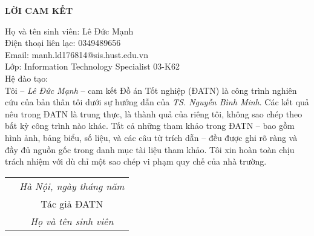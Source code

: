 \documentclass[../DoAn.tex]{subfiles}
\begin{document}
\hfill
\begin{center}
    \LARGE\textbf{LỜI CAM KẾT}\\
\end{center}
\vspace{1cm}
Họ và tên sinh viên: Lê Đức Mạnh\\
Điện thoại liên lạc: 0349489656\\ Email: manh.ld176814@sis.hust.edu.vn\\
Lớp: Information Technology Specialist 03-K62\\
Hệ đào tạo:  \\

\vspace{1cm}
Tôi – \emph{Lê Đức Mạnh} – cam kết Đồ án Tốt nghiệp (ĐATN) là công trình nghiên cứu của bản thân tôi dưới sự hướng dẫn của \emph{TS. Nguyễn Bình Minh}. Các kết quả nêu trong ĐATN là trung thực, là thành quả của riêng tôi, không sao chép theo bất kỳ công trình nào khác. Tất cả những tham khảo trong ĐATN – bao gồm hình ảnh, bảng biểu, số liệu, và các câu từ trích dẫn – đều được ghi rõ ràng và đầy đủ nguồn gốc trong danh mục tài liệu tham khảo. Tôi xin hoàn toàn chịu trách nhiệm với dù chỉ một sao chép vi phạm quy chế của nhà trường.

\begin{table}[H]
\centering
\begin{tabular}{p{5cm} c}
\multicolumn{1}{c}{\textbf{}} &\emph{Hà Nội, ngày\hspace{0.5cm} tháng\hspace{0.5cm}   năm    }\vspace{0.4cm}\\
\textbf{}               & Tác giả ĐATN \vspace{3cm} \\

\textbf{}               & \emph{Họ và tên sinh viên}
\end{tabular}
\end{table}
\end{document}
